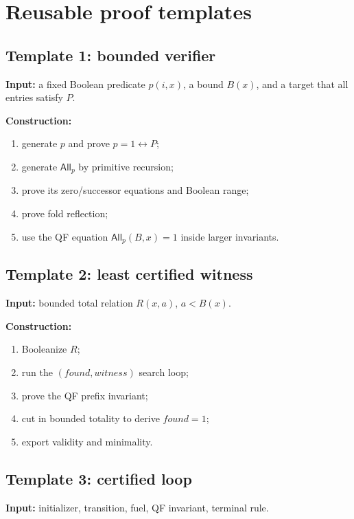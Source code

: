 \section{Reusable proof templates}

\subsection{Template 1: bounded verifier}

\textbf{Input:} a fixed Boolean predicate \(p(i,x)\), a bound \(B(x)\), and a target that all entries satisfy \(P\).

\textbf{Construction:}
\begin{enumerate}[label=(\arabic*)]
  \item generate \(p\) and prove \(p=1\leftrightarrow P\);
  \item generate \(\mathsf{All}_p\) by primitive recursion;
  \item prove its zero/successor equations and Boolean range;
  \item prove fold reflection;
  \item use the QF equation \(\mathsf{All}_p(B,x)=1\) inside larger invariants.
\end{enumerate}

\subsection{Template 2: least certified witness}

\textbf{Input:} bounded total relation \(R(x,a)\), \(a<B(x)\).

\textbf{Construction:}
\begin{enumerate}[label=(\arabic*)]
  \item Booleanize \(R\);
  \item run the \((found,witness)\) search loop;
  \item prove the QF prefix invariant;
  \item cut in bounded totality to derive \(found=1\);
  \item export validity and minimality.
\end{enumerate}

\subsection{Template 3: certified loop}

\textbf{Input:} initializer, transition, fuel, QF invariant, terminal rule.

